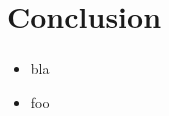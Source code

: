 \section{Conclusion}
\begin{frame}
    \frametitle{\insertsection}
    \vspace{.8em} %
    \begin{itemize}
        \setlength\itemsep{0.8em}
        \item bla
        \item foo
    \end{itemize}
\end{frame}